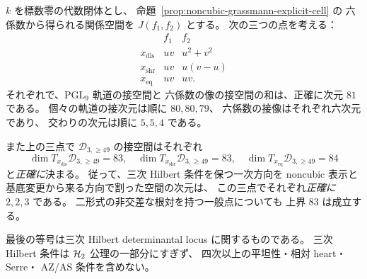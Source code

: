 \begin{proposition}
\label{prop:noncubic-third-degree-tangent}
$k$ を標数零の代数閉体とし、
命題~\ref{prop:noncubic-grassmann-explicit-cell} の
六係数から得られる関係空間を $J(f_1,f_2)$ とする。
次の三つの点を考える：
\[
\begin{array}{c|c|c}
 &f_1&f_2\\ \hline
 x_{\mathrm{dis}}&uv&u^2+v^2\\
 x_{\mathrm{shr}}&uv&u(v-u)\\
 x_{\mathrm{eq}}&uv&uv .
\end{array}
\tag{H3-types}\label{eq:noncubic-tangent-examples}
\]
それぞれで、$\mathrm{PGL}_9$ 軌道の接空間と
六係数の像の接空間の和は、正確に次元 $81$ である。
個々の軌道の接次元は順に $80,80,79$、
六係数の接像はそれぞれ六次元であり、
交わりの次元は順に $5,5,4$ である。

また上の三点で
$\mathcal D_{3,\ge49}$ の接空間はそれぞれ
\[
 \dim T_{x_{\mathrm{dis}}}\mathcal D_{3,\ge49}=83,
 \quad
 \dim T_{x_{\mathrm{shr}}}\mathcal D_{3,\ge49}=83,
 \quad
 \dim T_{x_{\mathrm{eq}}}\mathcal D_{3,\ge49}=84
 \tag{H3-bound}\label{eq:noncubic-tangent-bounds}
\]
と\emph{正確に}決まる。
従って、三次 Hilbert 条件を保つ一次方向を
noncubic 表示と基底変更から来る方向で割った空間の次元は、
この三点でそれぞれ\emph{正確に} $2,2,3$ である。
二形式の非交差な根対を持つ一般点についても
上界 $83$ は成立する。

最後の等号は三次 Hilbert determinantal locus に関するものである。
三次 Hilbert 条件は $\mathcal H_2$ 公理の一部分にすぎず、
四次以上の平坦性・相対 heart・Serre・
AZ/AS 条件を含めない。
\end{proposition}
